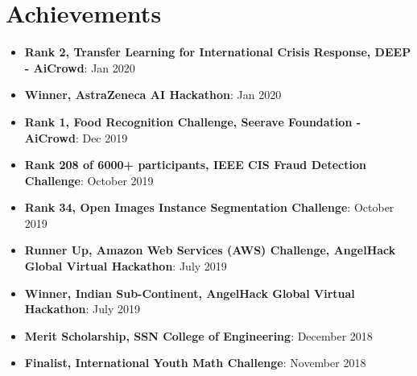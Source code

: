 \documentclass[letterpaper,11pt]{article}
\newcommand{\resumeItem}[2]{
  \item\small{
    \textbf{#1}{: #2 \vspace{-2pt}}
  }
}
\newcommand{\resumeSubItem}[2]{\resumeItem{#1}{#2}\vspace{-4pt}}
\newcommand{\resumeSubHeadingListStart}{\begin{itemize}[leftmargin=*]}
\newcommand{\resumeSubHeadingListEnd}{\end{itemize}}
\begin{document}
\section{Achievements}
  \resumeSubHeadingListStart
                 \resumeSubItem
  {Rank 2, Transfer Learning for International Crisis Response, DEEP - AiCrowd}{Jan 2020}
               \resumeSubItem
  {Winner, AstraZeneca AI Hackathon}{Jan 2020}
             \resumeSubItem
  {Rank 1, Food Recognition Challenge, Seerave Foundation - AiCrowd}{Dec 2019}
           \resumeSubItem
  {Rank 208 of 6000+ participants, IEEE CIS Fraud Detection Challenge}{October 2019}
         \resumeSubItem
  {Rank 34, Open Images Instance Segmentation Challenge}{October 2019}
       \resumeSubItem
  {Runner Up, Amazon Web Services (AWS) Challenge, AngelHack Global Virtual Hackathon}{July 2019}
     \resumeSubItem
  {Winner, Indian Sub-Continent, AngelHack Global Virtual Hackathon}{July 2019}
        \resumeSubItem
  {Merit Scholarship, SSN College of Engineering}{December 2018}
  \resumeSubItem
    {Finalist, International Youth Math Challenge}{November 2018}
  \resumeSubHeadingListEnd

\iffalse
\section{Programming Skills}
  \resumeSubHeadingListStart
   \item{
     \textbf{Languages}{: Python, C, Java, C++, SQL}
      }
      \item{
       \textbf{Frameworks and Technologies}{: Android Studio, Keras, TensorFlow, PyTorch, FastAI}
    }
  \resumeSubHeadingListEnd
\fi
\end{document}
